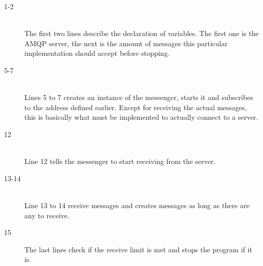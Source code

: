 \begin{description}
\item[1-2] \hfill \\ The first two lines describe the declaration of variables. The first one is the AMQP server, the next is the amount of messages this particular implementation should accept before stopping.

\item[5-7] \hfill \\ Lines 5 to 7 creates an instance of the messenger, starts it and subscribes to the address defined earlier. Except for receiving the actual messages, this is basically what must be implemented to actually connect to a server.

\item[12] \hfill \\ Line 12 tells the messenger to start receiving from the server. 
\item[13-14] \hfill \\ Line 13 to 14 receive messages and creates messages as long as there are any to receive.

\item[15] \hfill The last lines check if the receive limit is met and stops the program if it is.
\end{description}

\clearpage